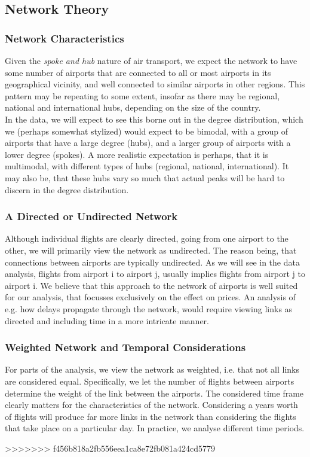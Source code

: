 \subsection{Network Theory}
\label{subsec:Network Theory}

\subsubsection{Network Characteristics}
Given the \textit{spoke and hub} nature of air transport, we expect the network to have some number of airports that are connected to all or most airports in its geographical vicinity, and well connected to similar airports in other regions. This pattern may be repeating to some extent, insofar as there may be regional, national and international hubs, depending on the size of the country. \\
In the data, we will expect to see this borne out in the degree distribution, which we (perhaps somewhat stylized) would expect to be bimodal, with a group of airports that have a large degree (hubs), and a larger group of airports with a lower degree (spokes). A more realistic expectation is perhaps, that it is multimodal, with different types of hubs (regional, national, international). It may also be, that these hubs vary so much that actual peaks will be hard to discern in the degree distribution.

\subsubsection{A Directed or Undirected Network}
Although individual flights are clearly directed, going from one airport to the other, we will primarily view the network as undirected. The reason being, that connections between airports are typically undirected. 
As we will see in the data analysis, flights from airport i to airport j, usually implies flights from airport j to airport i. We believe that this approach to the network of airports is well suited for our analysis, that focusses exclusively on the effect on prices. An analysis of e.g. how delays propagate through the network, would require viewing links as directed and including time in a more intricate manner.\\

\subsubsection{Weighted Network and Temporal Considerations}
For parts of the analysis, we view the network as weighted, i.e. that not all links are considered equal. Specifically, we let the number of flights between airports determine the weight of the link between the airports. 
\medskip
The considered time frame clearly matters for the characteristics of the network. Considering a years worth of flights will produce far more links in the network than considering the flights that take place on a particular day. In practice, we analyse different time periods. 


>>>>>>> f456b818a2fb556eea1ca8e72fb081a424cd5779


